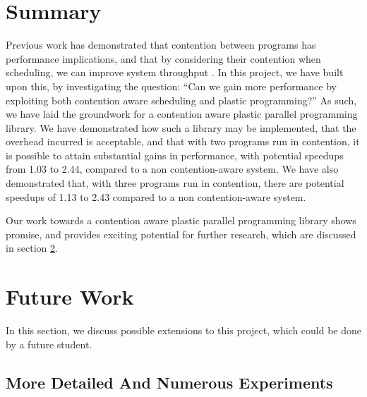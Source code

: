 
\section{Summary}
\label{section:conclusion_and_future_work:conclusion}

Previous work has demonstrated that contention between programs has performance implications, and that by considering their contention when scheduling, we can improve system throughput \cite{lira}. In this project, we have built upon this, by investigating the question: ``Can we gain more performance by exploiting both contention aware scheduling and plastic programming?'' As such, we have laid the groundwork for a contention aware plastic parallel programming library. We have demonstrated how such a library may be implemented, that the overhead incurred is acceptable, and that with two programs run in contention, it is possible to attain substantial gains in performance, with potential speedups from 1.03 to 2.44, compared to a non contention-aware system. We have also demonstrated that, with three programs run in contention, there are potential speedups of 1.13 to 2.43 compared to a non contention-aware system.


Our work towards a contention aware plastic parallel programming library shows promise, and provides exciting potential for further research, which are discussed in section \ref{section:conclusion_and_future_work:future_work}.





\section{Future Work}
\label{section:conclusion_and_future_work:future_work}

In this section, we discuss possible extensions to this project, which could be done by a future student.



\subsection{More Detailed And Numerous Experiments}
\label{section:conclusion_and_future_work:more_detailed_and_numerous_experiments}


